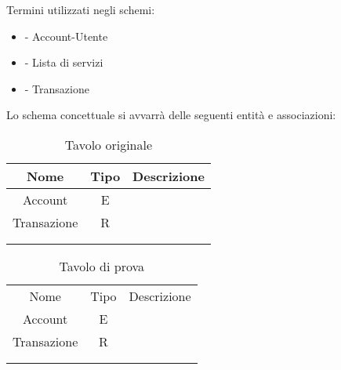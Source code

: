 Termini utilizzati negli schemi:
\begin{itemize}
    \item - Account-Utente
    \item - Lista di servizi
    \item - Transazione
\end{itemize}


Lo schema concettuale si avvarrà delle seguenti entità e associazioni:
\begin{table} [htbp]
    \centering
    \begin{tabular}
    {|c|c|c|}
    \hline
         Nome&  Tipo& Descrizione\\
         \hline
         Account&  E& \\
         Transazione&  R& \\
         &  & \\
         &  & \\
    \end{tabular}
    \caption{Tavolo originale}
\end{table}

\begin{table}[htbp]
    \centering
    \begin{tabular}
{|c|c|c|}
    \hline
         Nome&  Tipo& Descrizione\\
         Account&  E& \\
         Transazione&  R& \\
         &  & \\
         &  & \\
    \hline
    \end{tabular}
    \caption{Tavolo di prova}
\end{table}

